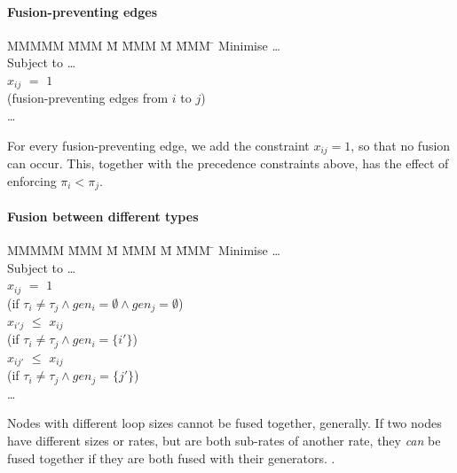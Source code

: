 \paragraph{Fusion-preventing edges}
\begin{tabbing}
MMMMM   \= MMM \= M \= MMM \= M \= MMM \= \kill
Minimise   \> \ldots \\
Subject to \> \ldots \\
           \> $x_{ij}$    \> $=$   \> $1$             \>       \>            \\
           \> (fusion-preventing edges from $i$ to $j$)      \\
           \> \ldots
\end{tabbing}
For every fusion-preventing edge, we add the constraint $x_{ij} = 1$, so that no fusion can occur.
This, together with the precedence constraints above, has the effect of enforcing $\pi_i < \pi_j$.


\paragraph{Fusion between different types}
\begin{tabbing}
MMMMM   \= MMM \= M \= MMM \= M \= MMM \= \kill
Minimise   \> \ldots \\
Subject to \> \ldots \\
           \> $x_{ij}$    \> $=$   \> $1$             \>       \>            \\
           \> (if $\tau_i \not= \tau_j \wedge gen_i=\emptyset \wedge gen_j=\emptyset$)                 \\
           \> $x_{i'j}$   \> $\le$ \> $x_{ij}$        \>       \>            \\
           \> (if $\tau_i \not= \tau_j \wedge gen_i=\{i'\}$) \\
           \> $x_{ij'}$   \> $\le$ \> $x_{ij}$        \>       \>            \\
           \> (if $\tau_i \not= \tau_j \wedge gen_j=\{j'\}$) \\
           \> \ldots
\end{tabbing}
Nodes with different loop sizes cannot be fused together, generally.
If two nodes have different sizes or rates, but are both sub-rates of another rate, they \emph{can} be fused together if they are both fused with their generators.
.

